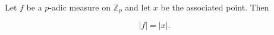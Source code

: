Let $f$ be a $p$-adic measure on $\mathbb{Z}_p$ and let $x$ be the associated point. Then

$$|f| = |x|.$$
